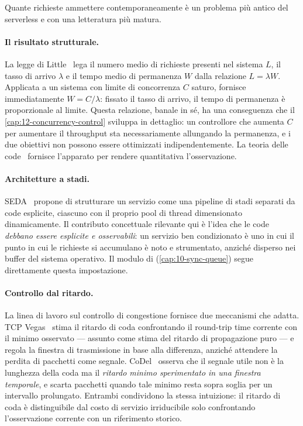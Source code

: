 Quante richieste ammettere contemporaneamente \`e un problema pi\`u antico del
serverless e con una letteratura pi\`u matura.

\paragraph{Il risultato strutturale.} La legge di Little~\cite{little1961proof}
lega il numero medio di richieste presenti nel sistema $L$, il tasso di arrivo
$\lambda$ e il tempo medio di permanenza $W$ dalla relazione $L = \lambda W$.
Applicata a un sistema con limite di concorrenza $C$ saturo, fornisce
immediatamente $W = C / \lambda$: fissato il tasso di arrivo, il tempo di
permanenza \`e proporzionale al limite. Questa relazione, banale in s\'e, ha una
conseguenza che il \cref{cap:12-concurrency-control} sviluppa in dettaglio: un
controllore che aumenta $C$ per aumentare il throughput sta necessariamente
allungando la permanenza, e i due obiettivi non possono essere ottimizzati
indipendentemente. La teoria delle code~\cite{kleinrock1975queueing} fornisce
l'apparato per rendere quantitativa l'osservazione.

\paragraph{Architetture a stadi.} SEDA~\cite{welsh2001seda} propone di
strutturare un servizio come una pipeline di stadi separati da code esplicite,
ciascuno con il proprio pool di thread dimensionato dinamicamente. Il contributo
concettuale rilevante qui \`e l'idea che le code \emph{debbano essere esplicite e
osservabili}: un servizio ben condizionato \`e uno in cui il punto in cui le
richieste si accumulano \`e noto e strumentato, anzich\'e disperso nei buffer
del sistema operativo. Il modulo  di \nf{}
(\cref{cap:10-sync-queue}) segue direttamente questa impostazione.

\paragraph{Controllo dal ritardo.} La linea di lavoro sul controllo di
congestione fornisce due meccanismi che \nf{} adatta.
TCP Vegas~\cite{brakmo1995vegas} stima il ritardo di coda confrontando il
round-trip time corrente con il minimo osservato --- assunto come stima del
ritardo di propagazione puro --- e regola la finestra di trasmissione in base
alla differenza, anzich\'e attendere la perdita di pacchetti come segnale.
CoDel~\cite{nichols2012codel} osserva che il segnale utile non \`e la lunghezza
della coda ma il \emph{ritardo minimo sperimentato in una finestra temporale},
e scarta pacchetti quando tale minimo resta sopra soglia per un intervallo
prolungato. Entrambi condividono la stessa intuizione: il ritardo di coda \`e
distinguibile dal costo di servizio irriducibile solo confrontando l'osservazione
corrente con un riferimento storico.

